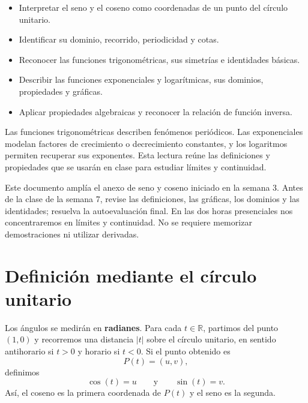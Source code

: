 \documentclass[10pt,a5paper]{article}
\begin{document}

\begin{objetivos}
\begin{itemize}
  \item Interpretar el seno y el coseno como coordenadas de un punto del círculo unitario.
  \item Identificar su dominio, recorrido, periodicidad y cotas.
  \item Reconocer las funciones trigonométricas, sus simetrías e identidades básicas.
  \item Describir las funciones exponenciales y logarítmicas, sus dominios, propiedades y gráficas.
  \item Aplicar propiedades algebraicas y reconocer la relación de función inversa.
\end{itemize}
\end{objetivos}

\begin{resumen}
Las funciones trigonométricas describen fenómenos periódicos. Las exponenciales modelan factores de crecimiento o decrecimiento constantes, y los logaritmos permiten recuperar sus exponentes. Esta lectura reúne las definiciones y propiedades que se usarán en clase para estudiar límites y continuidad.
\end{resumen}

\begin{nota}
Este documento amplía el anexo de seno y coseno iniciado en la semana 3. Antes de la clase de la semana 7, revise las definiciones, las gráficas, los dominios y las identidades; resuelva la autoevaluación final. En las dos horas presenciales nos concentraremos en límites y continuidad. No se requiere memorizar demostraciones ni utilizar derivadas.
\end{nota}

\section*{Definición mediante el círculo unitario}

Los ángulos se medirán en \textbf{radianes}. Para cada $t\in\mathbb{R}$, partimos del punto $(1,0)$ y recorremos una distancia $|t|$ sobre el círculo unitario, en sentido antihorario si $t>0$ y horario si $t<0$. Si el punto obtenido es
\[
  P(t)=(u,v),
\]
definimos
\[
  \cos(t)=u
  \qquad\text{y}\qquad
  \sin(t)=v.
\]
Así, el coseno es la primera coordenada de $P(t)$ y el seno es la segunda.
\end{document}
